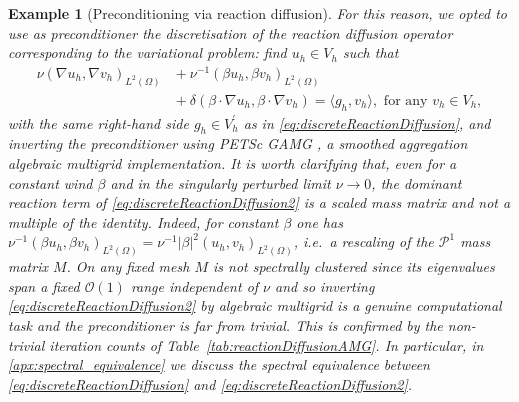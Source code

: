 \documentclass[hidelinks,onefignum,onetabnum]{siamart220329}
\newcommand{\bb}[1]{#1}
\newtheorem{example}{Example}
\begin{document}
\begin{example}[Preconditioning via reaction diffusion]
    For this reason, we opted to use as preconditioner the discretisation of the reaction diffusion operator corresponding to the variational problem: find $u_h\in V_h$ such that
    \begin{equation}
        \label{eq:discreteReactionDiffusion2}
        \begin{aligned}
            \nu ( \nabla u_h, \nabla v_h)_{L^2(\Omega)} &{}+ \nu^{-1}(\beta u_h,\beta v_h)_{L^2(\Omega)} \\
            &\bb{{}+ \delta(\beta\cdot\nabla u_h,\beta\cdot\nabla v_h) = \langle g_h,v_h \rangle}, \text{ for any } v_h\in V_h,
        \end{aligned}
    \end{equation}
    \bb{with the same right-hand side $g_h\in V_h^\prime$ as in \eqref{eq:discreteReactionDiffusion},}
    and inverting the preconditioner using PETSc GAMG \cite{Adams}, a smoothed aggregation algebraic multigrid implementation.
    \bb{It is worth clarifying that, even for a constant wind $\beta$ and in the singularly perturbed limit $\nu\to 0$, the dominant reaction term of \eqref{eq:discreteReactionDiffusion2} is a scaled \emph{mass} matrix and not a multiple of the identity. Indeed, for constant $\beta$ one has $\nu^{-1}(\beta u_h,\beta v_h)_{L^2(\Omega)} = \nu^{-1}\lvert\beta\rvert^2 (u_h, v_h)_{L^2(\Omega)}$, i.e.~a rescaling of the $\mathcal{P}^1$ mass matrix $M$. On any fixed mesh $M$ is not spectrally clustered since its eigenvalues span a fixed $\mathcal{O}(1)$ range independent of $\nu$ and so inverting \eqref{eq:discreteReactionDiffusion2} by algebraic multigrid is a genuine computational task and the preconditioner is far from trivial. This is confirmed by the non-trivial iteration counts of Table~\ref{tab:reactionDiffusionAMG}.}
    In particular, in \cref{apx:spectral_equivalence} we discuss the spectral equivalence between \eqref{eq:discreteReactionDiffusion} and \eqref{eq:discreteReactionDiffusion2}.

\end{example}
\end{document}
